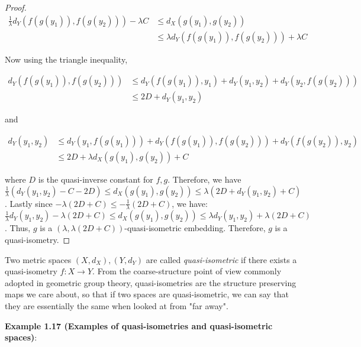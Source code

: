 \documentclass[12pt]{article}
\newcommand{\vs}{\vskip10pt}
\begin{document}
\begin{proof}
 		\begin{align*}
 		\frac{1}{\lambda} d_Y(f(g(y_1)), f(g(y_2))) - \lambda C &\leq d_X(g(y_1), g(y_2)) \\
 		&\leq \lambda d_Y(f(g(y_1)), f(g(y_2))) + \lambda C
 		\end{align*}
 		
 		Now using the triangle inequality,
 		
 		\begin{align*}
 		d_Y(f(g(y_1)), f(g(y_2))) &\leq d_Y(f(g(y_1)), y_1) + d_Y(y_1, y_2) + d_Y(y_2, f(g(y_2))) \\
 		&\leq 2D + d_Y(y_1,y_2)
 		\end{align*}
 		
 		and 
 		
 		\begin{align*}
 		d_Y(y_1, y_2) &\leq d_Y(y_1, f(g(y_1))) + d_Y(f(g(y_1)), f(g(y_2))) + d_Y(f(g(y_2)), y_2) \\
 		&\leq 2D + \lambda d_X(g(y_1), g(y_2)) + C
 		\end{align*}
 		
 		 where $D$ is the quasi-inverse constant for $f,g$. Therefore, we have $\frac{1}{\lambda} (d_Y(y_1, y_2) - C - 2D) \leq  d_X(g(y_1), g(y_2)) \leq \lambda (2D + d_Y(y_1, y_2) + C)$. Lastly since $-\lambda(2D + C) \leq -\frac{1}{\lambda} (2D + C)$, we have: $\frac{1}{\lambda} d_Y(y_1, y_2) - \lambda (2D + C) \leq d_X(g(y_1), g(y_2)) \leq \lambda d_Y(y_1, y_2) + \lambda(2D + C)$. Thus, $g$ is a $(\lambda, \lambda(2D + C))$-quasi-isometric embedding. Therefore, $g$ is a quasi-isometry. 
 		
 	\end{proof}
 
 	Two metric spaces $(X, d_X), (Y, d_Y)$ are called \textit{quasi-isometric} if there exists a quasi-isometry $f: X \rightarrow Y$. From the coarse-structure point of view commonly adopted in geometric group theory, quasi-isometries are the structure preserving maps we care about, so that if two spaces are quasi-isometric, we can say that they are essentially the same when looked at from "far away". 
 
 	\vs 
 	
 	\textbf{Example 1.17 (Examples of quasi-isometries and quasi-isometric spaces)}:
 	
\end{document}
